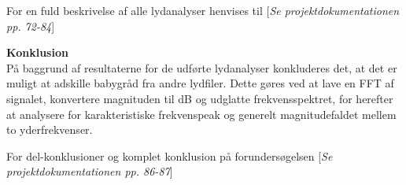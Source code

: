 For en fuld beskrivelse af alle lydanalyser henvises til [\textit{Se projektdokumentationen pp. 72-84}]

\textbf{Konklusion}\\ 
På baggrund af resultaterne for de udførte lydanalyser konkluderes det, at det er muligt at adskille babygråd fra andre lydfiler. Dette gøres ved at lave en FFT af signalet, konvertere magnituden til dB og udglatte frekvensspektret, for herefter at analysere for karakteristiske frekvenspeak og generelt magnitudefaldet mellem to yderfrekvenser. 

For del-konklusioner og komplet konklusion på forundersøgelsen [\textit{Se projektdokumentationen pp. 86-87}]